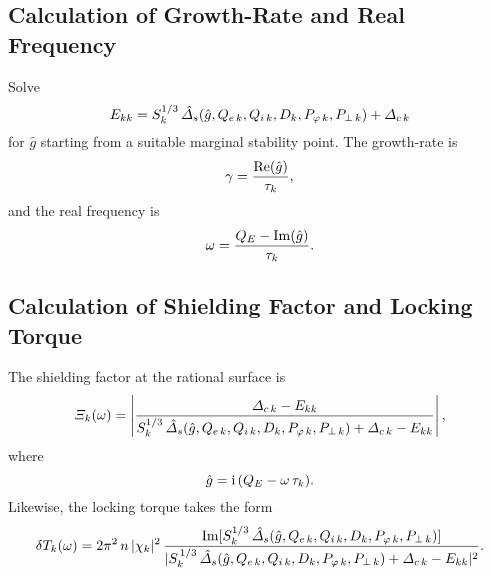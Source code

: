 \documentclass[12pt,prb,aps,notitlepage]{revtex4-1}
\begin{document}
\subsection{Calculation of Growth-Rate and Real Frequency}
Solve
\begin{equation}
E_{kk}  = S^{1/3}_k\,\hat{\mit\Delta}_s(\hat{g}, Q_{e\,k},Q_{i\,k},D_k,P_{\varphi\,k},P_{\perp\,k})+ {\mit\Delta}_{c\,k}
\end{equation}
for $\hat{g}$ starting from a suitable marginal stability point. 
The growth-rate is
\begin{equation}
\gamma =\frac{{\rm Re}(\hat{g})}{\tau_k},
\end{equation}
and the real frequency is
\begin{equation}
\omega = \frac{Q_E-{\rm Im}(\hat{g})}{\tau_k}.
\end{equation}

\subsection{Calculation of Shielding Factor and Locking Torque}
The shielding factor at the rational surface is
\begin{equation}
{\mit\Xi}_k(\omega) = \left|\frac{{\mit\Delta}_{c\,k}-E_{kk} }{S_k^{1/3}\,\hat{\mit\Delta}_s(\hat{g}, Q_{e\,k},Q_{i\,k},D_k,P_{\varphi\,k},P_{\perp\,k})+
{\mit\Delta}_{c\,k}-E_{kk}}\right|,
\end{equation}
where
\begin{equation}
\hat{g} = {\rm i}\,(Q_E-\omega\,\tau_k).
\end{equation}
Likewise, the locking torque takes the form
\begin{equation}
\delta T_k(\omega) = 2\pi^2\,n \,|\chi_k|^2\,\frac{{\rm Im}[S_k^{1/3}\,\hat{\mit\Delta}_s(\hat{g}, Q_{e\,k},Q_{i\,k},D_k,P_{\varphi\,k},P_{\perp\,k})]}{
|S_k^{\,1/3}\,\hat{\mit\Delta}_s(\hat{g}, Q_{e\,k},Q_{i\,k},D_k,P_{\varphi\,k},P_{\perp\,k})+{\mit\Delta}_{c\,k}-E_{kk}|^2}.
\end{equation}
\end{document}
